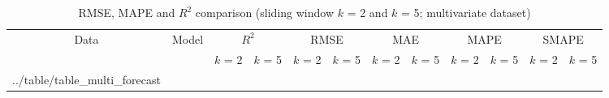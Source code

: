 \documentclass[smallcondensed, natbib]{svjour3}     %
\makeatletter
\newcommand\primitiveinput[1]
		{\@@input #1 }
\makeatother
\begin{document}
{%

\begin{table}[h]
	\caption{RMSE, MAPE and $R^2$ comparison (sliding window $k$ = 2 and $k$ = 5; multivariate dataset)}
	\label{table:multi_forecast}
	\centering
	\begin{adjustbox}{width=\textwidth}
		\begin{tabular}{| c | c | c | c | c | c | c | c | c | c | c | c |}%
			\hline
			\multirow{2}{*}{Data} & \multirow{2}{*}{Model} & \multicolumn{2}{c|}{$R^2$} & \multicolumn{2}{c|}{RMSE} & \multicolumn{2}{c|}{MAE} & \multicolumn{2}{c|}{MAPE}  & \multicolumn{2}{c|}{SMAPE} \\ \cline{3-12}
   				& & $k$ = 2 & $k$ = 5 & $k$ = 2 & $k$ = 5 & $k$ = 2 & $k$ = 5 & $k$ = 2 & $k$ = 5 & $k$ = 2 & $k$ = 5 \\ [0.5ex] 
			\hline
			\primitiveinput{../table/table_multi_forecast}
			\hline
		\end{tabular}
	\end{adjustbox}
\end{table}



}
\end{document}
